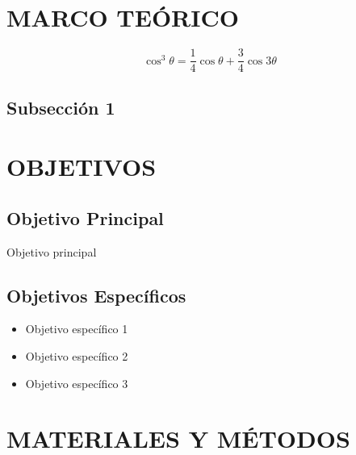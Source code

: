 \documentclass[fleqn,10pt]{SelfArx}
\begin{document}
\flushbottom %
\maketitle
\thispagestyle{empty} %

\section{MARCO TEÓRICO}

\begin{equation}
\cos^3 \theta =\frac{1}{4}\cos\theta+\frac{3}{4}\cos 3\theta
\label{Eq. 1}
\end{equation}

\subsection{Subsección 1}

\section{OBJETIVOS}
\subsection{Objetivo Principal}

Objetivo principal

\subsection{Objetivos Específicos}
\begin{itemize}[noitemsep]

\item Objetivo específico 1
\item Objetivo específico 2
\item Objetivo específico 3

\end{itemize}

\section{MATERIALES Y MÉTODOS}
\end{document}
